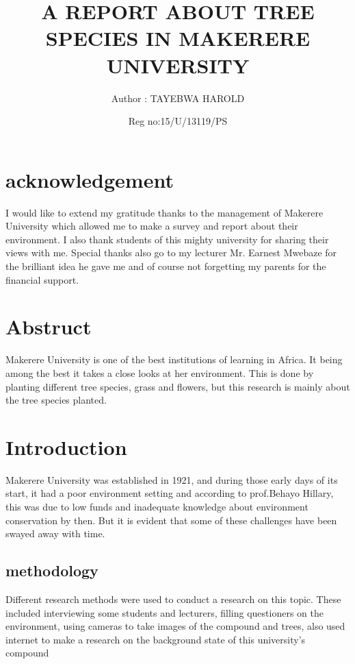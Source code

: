 \documentclass{article}
\begin{document}
		\title{A REPORT ABOUT TREE SPECIES IN MAKERERE UNIVERSITY}
		\author{Author : TAYEBWA HAROLD  }
		
                      \date{Reg no:15/U/13119/PS }
		\maketitle
	

	\tableofcontents
\section{acknowledgement}
  I would like to extend my gratitude thanks to the management of Makerere University which allowed me to make a survey and report about their environment.
I also thank students of this mighty university for sharing their views with me.
 Special thanks also go to my lecturer Mr. Earnest Mwebaze for the brilliant idea he gave me and of course not forgetting my parents for the financial support.

\section{Abstruct}

    Makerere University is one of the best institutions of learning in Africa. It being among the best it takes a close looks at her environment.
This is done by planting different tree species, grass and flowers, but this research is mainly about the tree species planted.

\section{Introduction}

    Makerere University was established in 1921, and during those early days of its start, it had a poor environment setting and according to prof.Behayo Hillary, this was due to low funds and inadequate knowledge about environment conservation by then.
But it is evident that some of these challenges have been swayed away with time.

\subsection{methodology}
    
    Different research methods were used to conduct a research on this topic.
These included interviewing some students and lecturers, filling questioners on the environment, using cameras to take images of the compound and trees, also used internet to make a research on the background state of this university’s compound 
    
\end{document}
